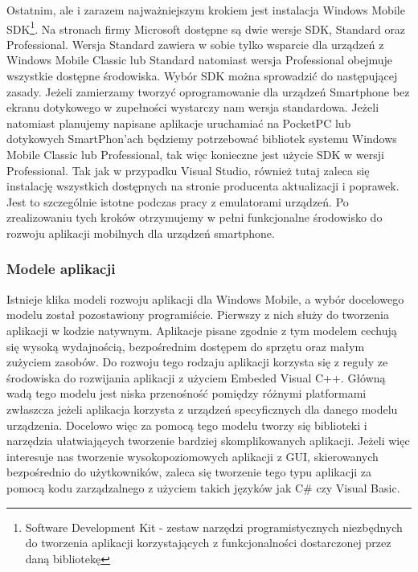 Ostatnim, ale i zarazem najważniejszym krokiem jest instalacja Windows Mobile
SDK\footnote{Software Development Kit - zestaw narzędzi programistycznych
niezbędnych do tworzenia aplikacji korzystających z funkcjonalności dostarczonej
przez daną bibliotekę}. Na stronach firmy Microsoft dostępne są dwie wersje SDK,
Standard oraz Professional. Wersja Standard zawiera w sobie tylko wsparcie dla
urządzeń z Windows Mobile Classic lub Standard natomiast wersja Professional
obejmuje wszystkie dostępne środowiska. Wybór SDK można sprowadzić do
następującej zasady. Jeżeli zamierzamy tworzyć oprogramowanie dla urządzeń
Smartphone bez ekranu dotykowego w zupełności wystarczy nam wersja standardowa.
Jeżeli natomiast planujemy napisane aplikacje uruchamiać na PocketPC lub
dotykowych SmartPhon'ach będziemy potrzebować bibliotek systemu Windows Mobile
Classic lub Professional, tak więc konieczne jest użycie SDK w wersji
Professional. Tak jak w przypadku Visual Studio, również tutaj zaleca się
instalację wszystkich dostępnych na stronie producenta aktualizacji i poprawek.
Jest to szczególnie istotne podczas pracy z emulatorami urządzeń. Po
zrealizowaniu tych kroków otrzymujemy w pełni funkcjonalne środowisko do rozwoju
aplikacji mobilnych dla urządzeń smartphone.

\subsubsection{Modele aplikacji}
Istnieje klika modeli rozwoju aplikacji dla Windows Mobile, a wybór docelowego
modelu został pozostawiony programiście. Pierwszy z nich służy do tworzenia
aplikacji w kodzie natywnym. Aplikacje pisane zgodnie z tym modelem cechują się
wysoką wydajnością, bezpośrednim dostępem do sprzętu oraz małym zużyciem zasobów.
Do rozwoju tego rodzaju aplikacji korzysta się z reguły ze środowiska do
rozwijania aplikacji z użyciem Embeded Visual C++. Główną wadą tego modelu jest
niska przenośność pomiędzy różnymi platformami zwłaszcza jeżeli aplikacja
korzysta z urządzeń specyficznych dla danego modelu urządzenia. Docelowo więc za
pomocą tego modelu tworzy się biblioteki i narzędzia ułatwiających tworzenie
bardziej skomplikowanych aplikacji. Jeżeli więc interesuje nas tworzenie
wysokopoziomowych aplikacji z GUI, skierowanych bezpośrednio do użytkowników,
zaleca się tworzenie tego typu aplikacji za pomocą kodu zarządzalnego z użyciem
takich języków jak C\# czy Visual Basic.


